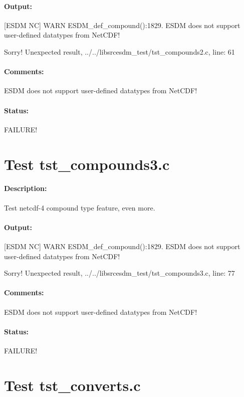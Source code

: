 \paragraph{Output:} [ESDM NC] WARN ESDM\_def\_compound():1829. ESDM does not support user-defined datatypes from NetCDF!

Sorry! Unexpected result, ../../libsrcesdm\_test/tst\_compounds2.c, line: 61

\paragraph{Comments:} ESDM does not support user-defined datatypes from NetCDF!

\paragraph{Status:} FAILURE!

\section{Test tst\_compounds3.c}

\paragraph{Description:} Test netcdf-4 compound type feature, even more.

\paragraph{Output:} [ESDM NC] WARN ESDM\_def\_compound():1829. ESDM does not support user-defined datatypes from NetCDF!

Sorry! Unexpected result, ../../libsrcesdm\_test/tst\_compounds3.c, line: 77

\paragraph{Comments:} ESDM does not support user-defined datatypes from NetCDF!

\paragraph{Status:} FAILURE!

\section{Test tst\_converts.c}


